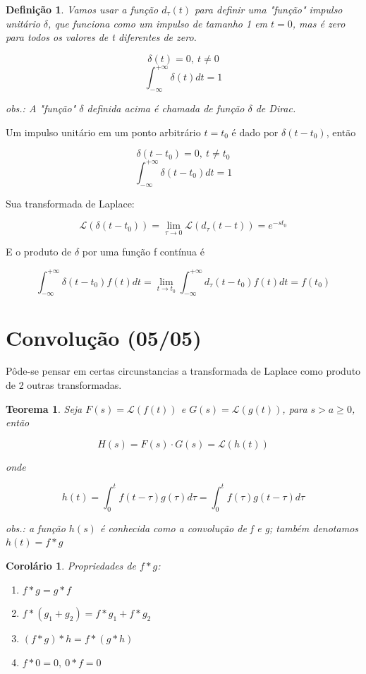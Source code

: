 \documentclass{article}
\newtheorem{theorem}{Teorema}[section]
\newtheorem{corollary}{Corolário}[theorem]
\newtheorem{definition}{Definição}
\begin{document}
\begin{definition}
    Vamos usar a função $d_\tau (t)$ para definir uma "função" impulso unitário $\delta$, que funciona como um impulso de tamanho 1 em $t = 0$, mas é zero para todos os valores de t diferentes de zero.
    
    $$\delta (t) = 0, \ t \neq 0$$
    $$\int_{- \infty}^{+ \infty} \delta (t) d t = 1$$
    
    obs.: A "função" $\delta$ definida acima é chamada de função $\delta$ de Dirac. 
\end{definition}

Um impulso unitário em um ponto arbitrário $t = t_0$ é dado por $\delta (t - t_0)$, então

$$\delta (t - t_0) = 0, \ t \neq t_0$$
$$\int_{- \infty}^{+ \infty} \delta (t - t_0) d t = 1$$

Sua transformada de Laplace:

$$\mathscr{L}(\delta(t - t_0)) = \lim_{\tau \xrightarrow{} 0} \mathscr{L}(d_\tau (t - t)) = e^{- st_0}$$

E o produto de $\delta$ por uma função f contínua é

$$\int_{- \infty}^{+ \infty} \delta (t - t_0) f(t) d t = \lim_{t \xrightarrow{} t_0} \int_{- \infty}^{+ \infty} d_\tau (t - t_0) f(t) d t = f(t_0)$$

\section*{Convolução (05/05)}
\label{s14}
Pôde-se pensar em certas circunstancias a transformada de Laplace como produto de 2 outras transformadas.

\begin{theorem}
    Seja $F(s) = \mathscr{L}(f(t))$ e $G(s) = \mathscr{L} (g(t))$, para $s > a \geq 0$, então
    
    $$H(s) = F(s) \cdot G(s) = \mathscr{L}(h(t))$$
    
    onde 
    
    $$h(t) = \int_0^t f(t - \tau) g(\tau) d \tau = \int_0^t f(\tau) g(t - \tau) d \tau$$
    
    obs.: a função $h(s)$ é conhecida como a convolução de f e g; também denotamos $h(t) = f * g$
\end{theorem}

\begin{corollary}
    Propriedades de $f * g$:
    
    \begin{enumerate}
        \item $f * g = g * f$
        \item $f * (g_1 + g_2) = f * g_1 + f * g_2$
        \item $(f * g) * h = f * (g * h)$
        \item $f * 0 = 0, \ 0 * f = 0$
    \end{enumerate}
\end{corollary}
\end{document}
